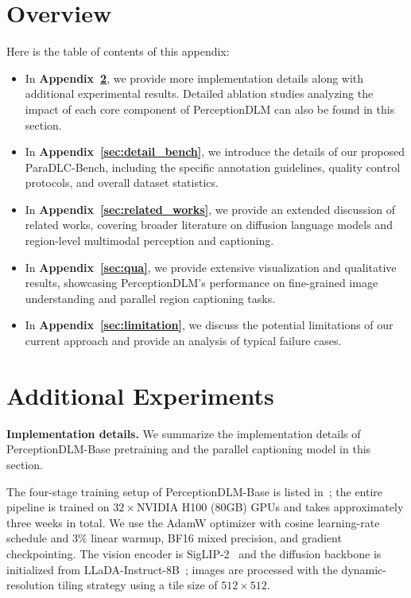 

\section{Overview}\vspace{-5pt}

Here is the table of contents of this appendix:

\begin{itemize}
    \item In \textbf{Appendix~\ref{sec:more_exp}}, we provide more implementation details along with additional experimental results. Detailed ablation studies analyzing the impact of each core component of PerceptionDLM can also be found in this section.
    \item In \textbf{Appendix~\ref{sec:detail_bench}}, we introduce the details of our proposed ParaDLC-Bench, including the specific annotation guidelines, quality control protocols, and overall dataset statistics.
    \item In \textbf{Appendix~\ref{sec:related_works}}, we provide an extended discussion of related works, covering broader literature on diffusion language models and region-level multimodal perception and captioning.
    \item In \textbf{Appendix~\ref{sec:qua}}, we provide extensive visualization and qualitative results, showcasing PerceptionDLM's performance on fine-grained image understanding and parallel region captioning tasks.
    \item In \textbf{Appendix~\ref{sec:limitation}}, we discuss the potential limitations of our current approach and provide an analysis of typical failure cases.
\end{itemize}

\section{Additional Experiments}
\label{sec:more_exp}

\noindent
\textbf{Implementation details.} We summarize the implementation details of PerceptionDLM-Base pretraining and the parallel captioning model in this section. 

The four-stage training setup of PerceptionDLM-Base is listed in~; the entire pipeline is trained on $32\times$NVIDIA H100 (80GB) GPUs and takes approximately three weeks in total. We use the AdamW optimizer with cosine learning-rate schedule and $3\%$ linear warmup, BF16 mixed precision, and gradient checkpointing. The vision encoder is SigLIP-2~\citep{tschannen2025siglip} and the diffusion backbone is initialized from LLaDA-Instruct-8B~\citep{nielarge}; images are processed with the dynamic-resolution tiling strategy using a tile size of $512\times512$.

